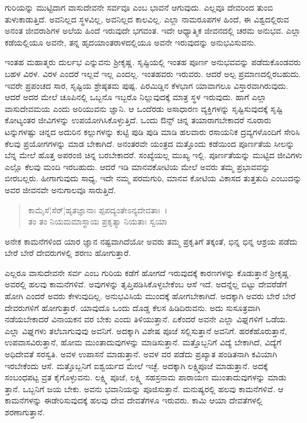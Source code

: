 ಗುರಿಯನ್ನು ಮುಟ್ಟಿದಾಗ ವಾಸುದೇವನೇ ಸರ್ವವೂ ಎಂಬ ಭಾವನೆ ಆಗುವುದು. ಎಲ್ಲವೂ ದೇವರಿಂದ ತುಂಬಿ ತುಳುಕಾಡುತ್ತಿದೆ. ಅವನಿಲ್ಲದ ಸ್ಥಳವಿಲ್ಲ, ಅವನಿಲ್ಲದ ಕಾಲವಿಲ್ಲ. ಎಲ್ಲಾ ನಾಮರೂಪಗಳ ಹಿಂದೆ, ಈ ವಿಶ್ವದಲ್ಲಿರುವ ಅನಂತ ಜೀವರಾಶಿಗಳ ಅಲೆಯ ಹಿಂದೆ ಇರುವುದೇ ಭಗವಂತ. ಇದೇ ಆಧ್ಯಾತ್ಮಿಕ ಜೀವನದಲ್ಲಿ ಚರಮ ಅನುಭವ. ಎಲ್ಲಾ ಕಡೆಯಲ್ಲಿಯೂ ಅವನೇ, ತನ್ನ ಹೃದಯಾಂತರಾಳದಲ್ಲಿಯೂ ಅವನೇ ಇರುವುದನ್ನು ಅನುಭವಿಸುವನು.

ಇಂತಹ ಮಹಾತ್ಮರು ದುರ್ಲಭ ಎನ್ನುವನು ಶ‍್ರೀಕೃಷ್ಣ. ಸೃಷ್ಟಿಯಲ್ಲಿ ಇಂತಹ ಪೂರ್ಣ ಅನುಭವವನ್ನು ಪಡೆದುಕೊಂಡವರು ಬಹಳ ವಿರಳ. ವಿರಳ ಎಂದರೆ ಇಲ್ಲವೆ ಇಲ್ಲ ಎಂದಲ್ಲ. ಇಂತಹವರು ಇರುವರು. ಆದರೆ ಅಲ್ಪ ಪ್ರಮಾಣದಲ್ಲಿರಬಹುದು. ಇವರೇ ಪ್ರಪಂಚದ ಸಾರ, ಸೃಷ್ಟಿಯ ಶ್ರೇಷ್ಠತಮ ಪುಷ್ಪ. ಪಿರಮಿಡ್ಡಿನ ಕೆಳಭಾಗ ಯಾವಾಗಲೂ ವಿಸ್ತಾರವಾಗಿರುವುದು. ಆದರೆ ಅದರ ಮೇಲೆ ಚೂಪಿನಲ್ಲಿ ಒಬ್ಬನೊ ಇಬ್ಬರೊ ನಿಲ್ಲುವುದಕ್ಕೆ ಮಾತ್ರ ಸ್ಥಳ ಇರುವುದು. ಹಾಗೆ ಎಲ್ಲಾ ವಾಸುದೇವಮಯ ಎಂದು ಅರಿಯುವನು ಜ್ಞಾನಿ. ಆ ಒಂದೆರಡು ಅಸಾಧಾರಣ ವ್ಯಕ್ತಿಗಳನ್ನು ಸೃಷ್ಟಿಸುವುದಕ್ಕೆ ಸೃಷ್ಟಿ ಕೋಟ್ಯಂತರ ಜೀವಿಗಳನ್ನು ಉಪಯೋಗಿಸಿಕೊಳ್ಳುತ್ತಿದೆ. ಒಂದು ಔನ್ಸ್ ಚಿನ್ನ ತಯಾರಾಗಬೇಕಾದರೆ ನೂರಾರು ಟನ್ನುಗಳಷ್ಟು ಚಿನ್ನದ ಅದುರಿನ ಕಲ್ಲುಗಳನ್ನು ಕುಟ್ಟಿ ಪುಡಿ ಪುಡಿ ಮಾಡಿ ಹಲವಾರು ರಸಾಯನಿಕ ದ್ರವ್ಯಗಳೊಂದಿಗೆ ಸೇರಿಸಿ ಕೆಲವು ಪ್ರಯೋಗಗಳನ್ನು ಮಾಡ ಬೇಕಾಗಿದೆ. ಅನಂತರವೇ ಯಂತ್ರದ ಮತ್ತೊಂದು ಕಡೆಯಿಂದ ಪೂರ್ಣತೆಯ ಸೀಲನ್ನು ಬೆನ್ನ ಮೇಲೆ ಹೊತ್ತ ಅಪರಂಜಿ ಚಿನ್ನ ಬರಬೇಕಾದರೆ. ಸಂಖ್ಯೆಯಲ್ಲ ಮುಖ್ಯ ಇಲ್ಲಿ. ಪೂರ್ಣತೆಯನ್ನು ಮುಟ್ಟಿದ ಜೀವಿಗಳು ಎಲ್ಲೊ ಕೆಲವು ಮಂದಿ ಇರಬಹುದು. ಆದರೆ ಇಡಿ ಮಾನವಕೋಟಿಯ ಮೇಲೆ ಅವರು ತಮ್ಮ ಪ್ರಭಾವವನ್ನು ಬೀರಬಲ್ಲರು. ಹೀಗಾಗುವುದು ಸಾಧ್ಯ, ಇದೇ ನಮ್ಮ ಪರಮಗುರಿ, ಮಾನವ ಕೋಟಿಯ ವಿಕಾಸದ ತುತ್ತತುದಿ ಎಂಬುದನ್ನು ಅವರ ಜೀವನವೇ ಅನುಗಾಲವೂ ಸಾರುತ್ತಿದೆ.

\begin{verse}
ಕಾಮೈಸೆ¦ಸೆರ್¦ಹೃತಜ್ಞಾನಾಃ ಪ್ಪಪದ್ಯಂತೇಽನ್ಯದೇವತಾಃ~।\\ತಂ ತಂ ನಿಯಮಮಾಸ್ಥಾಯ ಪ್ರಕೃತ್ಯಾ ನಿಯತಾಃ ಸ್ವಯಾ 
\end{verse}

{\small ಅನೇಕ ಕಾಮನೆಗಳಿಂದ ಯಾರ ಜ್ಞಾನ ನಷ್ಟವಾಗಿದೆಯೋ ಅವರು ತಮ್ಮ ಪ್ರಕೃತಿಗೆ ತಕ್ಕಂತೆ, ಭಿನ್ನ ಭಿನ್ನ ಆಶ್ರಯ ಪಡೆದು ಬೇರೆ ಬೇರೆ ದೇವರುಗಳಲ್ಲಿ ಶರಣು ಹೋಗುತ್ತಾರೆ.}

ಎಲ್ಲರೂ ವಾಸುದೇವನೇ ಸರ್ವ ಎಂಬ ಗುರಿಯ ಕಡೆಗೆ ಹೋಗದೆ ಇರುವುದಕ್ಕೆ ಕಾರಣಗಳನ್ನು ಕೊಡುತ್ತಾನೆ ಶ‍್ರೀಕೃಷ್ಣ. ಅವರಲ್ಲಿ ಹಲವು ಕಾಮನೆಗಳಿವೆ. ಅವುಗಳನ್ನು ತೃಪ್ತಿಪಡಿಸಿಕೊಳ್ಳಬೇಕೆಂಬ ಆಸೆ ಇದೆ. ಅದನ್ನೆಲ್ಲ ಬಿಟ್ಟು ದೇವರೆಡೆಗೆ ಹೋಗಿ ಎಂದರೆ ಅವರು ಕೇಳುವುದಿಲ್ಲ. ಅನುಭವಿಸಿಯೆ ಮುಂದಕ್ಕೆ ಹೋಗಬೇಕಾಗಿದೆ. ಅದಕ್ಕಾಗಿ ಅವರು ಬೇರೆ ಬೇರೆ ದೇವರುಗಳಿಗೆ ಹೋಗುತ್ತಾರೆ. ಯಾವುದೊ ಒಂದು ದೊಡ್ಡ ಕೆಲಸ ಹಿಡಿದಿರುವನು. ಅದು ಸುಸೂತ್ರವಾಗಿ ನಡೆಯಬೇಕಾದರೆ ವಿನಾಯಕನ ವರ ಬೇಕು ಎಂದು ತಿಳಿಯುತ್ತಾನೆ. ಏಕೆಂದರೆ ಅವನೇ ಎಲ್ಲಾ ವಿಘ್ನಗಳಿಗೆ ಒಡೆಯ. ಎಲ್ಲಾ ವಿಘ್ನಗಳು ತಲೆಬಾಗುವುವು ಅವನಿಗೆ. ಅದಕ್ಕಾಗಿ ವಿಶೇಷ ಪೂಜೆ ಸಲ್ಲಿಸುತ್ತಾನೆ ಅವನಿಗೆ. ಹರಕೆಹೊರುತ್ತಾನೆ, ಉಪವಾಸವಿರುತ್ತಾನೆ, ಹೋಮ ಮುಂತಾದುವುಗಳನ್ನು ಮಾಡಿಸುತ್ತಾನೆ. ಮತ್ತೊಬ್ಬನಿಗೆ ವಿದ್ಯೆ ಬೇಕಾಗಿದೆ, ವಿದ್ಯೆಗೆ ಅಧಿದೇವತೆ ಸರಸ್ವತಿ. ಅವಳ ಉಪಾಸನೆ ಮಾಡುತ್ತಾನೆ. ಅವಳ ವರ ಪಡೆದು ಪ್ರಖ್ಯಾತ ಪಂಡಿತನಾಗಿ ಕವಿಯಾಗಿ ಇರಬೇಕೆಂದು ಆಸೆ. ಮತ್ತೊಬ್ಬನಿಗೆ ಐಶ್ವರ್ಯದ ಮೇಲೆ ಇಚ್ಛೆ. ಅದಕ್ಕಾಗಿ ಲಕ್ಷ್ಮಿಪೂಜೆ ಮಾಡುತ್ತಾನೆ. ಅದಕ್ಕೆ ಸಂಬಂಧಪಟ್ಟ ವ್ರತ ಕೈಗೊಳ್ಳುವನು. ಲಕ್ಷ್ಮಿ ಪೂಜೆ, ಲಕ್ಷ್ಮಿ ಸಹಸ್ರನಾಮ ಪಾರಾಯಣ ಮುಂತಾದುವುಗಳನ್ನು ಮಾಡು ತ್ತಾನೆ. ಒಬ್ಬನಿಗೆ ಜಯ ಬೇಕು. ಅವನು ಭವಾನಿಯನ್ನು ಪೂಜಿಸುತ್ತಾನೆ. ಮನುಷ್ಯರಲ್ಲಿ ಹಲವು ಕಾಮನೆಗಳಿವೆ. ಆ ಕಾಮನೆಗಳನ್ನು ಈಡೇರಿಸುವುದಕ್ಕೆ ಹಲವು ದೇವ ದೇವತೆಗಳೂ ಇರುವರು. ಕಾಮಿ ಆಯಾ ದೇವತೆಗಳಲ್ಲಿ ಶರಣಾಗುತ್ತಾನೆ.

